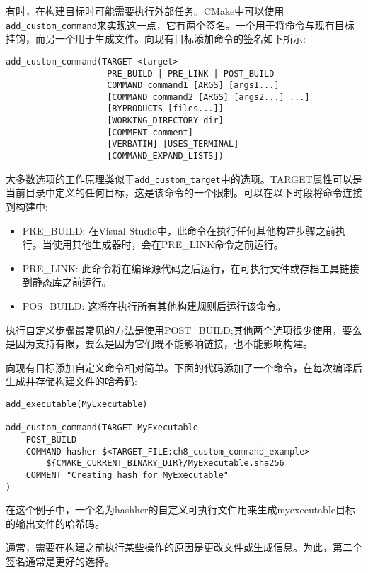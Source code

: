 有时，在构建目标时可能需要执行外部任务。CMake中可以使用\texttt{add\_custom\_command}来实现这一点，它有两个签名。一个用于将命令与现有目标挂钩，而另一个用于生成文件。向现有目标添加命令的签名如下所示:

\begin{lstlisting}[style=styleCMake]
add_custom_command(TARGET <target>
					PRE_BUILD | PRE_LINK | POST_BUILD
					COMMAND command1 [ARGS] [args1...]
					[COMMAND command2 [ARGS] [args2...] ...]
					[BYPRODUCTS [files...]]
					[WORKING_DIRECTORY dir]
					[COMMENT comment]
					[VERBATIM] [USES_TERMINAL]
					[COMMAND_EXPAND_LISTS])
\end{lstlisting}

大多数选项的工作原理类似于\texttt{add\_custom\_target}中的选项。TARGET属性可以是当前目录中定义的任何目标，这是该命令的一个限制。可以在以下时段将命令连接到构建中:

\begin{itemize}
\item 
PRE\_BUILD: 在Visual Studio中，此命令在执行任何其他构建步骤之前执行。当使用其他生成器时，会在PRE\_LINK命令之前运行。

\item 
PRE\_LINK: 此命令将在编译源代码之后运行，在可执行文件或存档工具链接到静态库之前运行。

\item 
POS\_BUILD: 这将在执行所有其他构建规则后运行该命令。
\end{itemize}

执行自定义步骤最常见的方法是使用POST\_BUILD;其他两个选项很少使用，要么是因为支持有限，要么是因为它们既不能影响链接，也不能影响构建。

向现有目标添加自定义命令相对简单。下面的代码添加了一个命令，在每次编译后生成并存储构建文件的哈希码:

\begin{lstlisting}[style=styleCMake]
add_executable(MyExecutable)

add_custom_command(TARGET MyExecutable
	POST_BUILD
	COMMAND hasher $<TARGET_FILE:ch8_custom_command_example>
		${CMAKE_CURRENT_BINARY_DIR}/MyExecutable.sha256
	COMMENT "Creating hash for MyExecutable"
)
\end{lstlisting}

在这个例子中，一个名为hashher的自定义可执行文件用来生成myexecutable目标的输出文件的哈希码。

通常，需要在构建之前执行某些操作的原因是更改文件或生成信息。为此，第二个签名通常是更好的选择。


